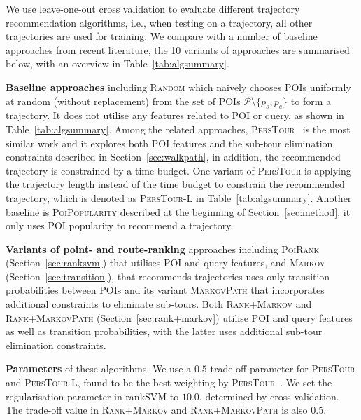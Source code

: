 We use leave-one-out cross validation to evaluate different trajectory recommendation algorithms,
i.e., when testing on a trajectory, all other trajectories are used for training.
We compare with a number of baseline approaches from recent literature, the 10 variants of approaches
are summarised below, with an overview in Table~\ref{tab:algsummary}.

{\bf Baseline approaches} including \textsc{Random} which naively chooses POIs uniformly at random
(without replacement) from the set of POIs $\mathcal{P} \setminus \{p_s, p_e \}$ to form a trajectory.
It does not utilise any features related to POI or query, as shown in Table~\ref{tab:algsummary}.
Among the related approaches, \textsc{PersTour}~\cite{ijcai15} is the most similar work and it
explores both POI features and the sub-tour elimination constraints described in Section~\ref{sec:walkpath},
in addition, the recommended trajectory is constrained by a time budget.
One variant of \textsc{PersTour} is applying the trajectory length instead of the time budget to constrain
the recommended trajectory, which is denoted as \textsc{PersTour-L} in Table~\ref{tab:algsummary}.
Another baseline is \textsc{PoiPopularity} described at the beginning of Section~\ref{sec:method},
it only uses POI popularity to recommend a trajectory.

{\bf Variants of point- and route-ranking} approaches including \textsc{PoiRank} (Section~\ref{sec:ranksvm})
that utilises POI and query features,
and \textsc{Markov} (Section~\ref{sec:transition}),
that recommends trajectories uses only transition probabilities between POIs
and its variant \textsc{MarkovPath} that incorporates additional constraints to eliminate sub-tours.
Both \textsc{Rank+Markov} and \textsc{Rank+MarkovPath} (Section~\ref{sec:rank+markov})
utilise POI and query features as well as transition probabilities, with the latter uses
additional sub-tour elimination constraints.

{\bf Parameters} of these algorithms.
We use a $0.5$ trade-off parameter for \textsc{PersTour} and \textsc{PersTour-L},
found to be the best weighting by \textsc{PersTour}~\cite{ijcai15}.
We set the regularisation parameter in rankSVM to  $10.0$, determined by cross-validation.
The trade-off value in \textsc{Rank+Markov} and \textsc{Rank+MarkovPath} is also $0.5$.


